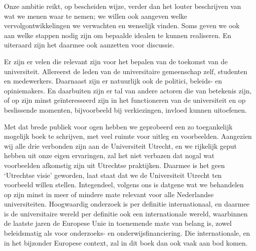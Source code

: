 \documentclass[smallauthor, chapterhaspagenum, nochapterinheader, pagenuminheader,  bigchapnum,medium2, tocpages, garamond, titleinheader]{jote-book}
\begin{document}
	Onze ambitie reikt, op bescheiden wijze, verder dan het louter beschrijven van wat we menen waar te nemen; we willen ook aangeven welke vervolgontwikkelingen we verwachten en wenselijk vinden. Soms geven we ook aan welke stappen nodig zijn om bepaalde idealen te kunnen realiseren. En uiteraard zijn het daarmee ook aanzetten voor discussie.



	Er zijn er velen die relevant zijn voor het bepalen van de toekomst van de universiteit. Allereerst de leden van de universitaire gemeenschap zelf, studenten en medewerkers. Daarnaast zijn er natuurlijk ook de politici, beleids- en opiniemakers. En daarbuiten zijn er tal van andere actoren die van betekenis zijn, of op zijn minst geïnteresseerd zijn in het functioneren van de universiteit en op beslissende momenten, bijvoorbeeld bij verkiezingen, invloed kunnen uitoefenen.



	Met dat brede publiek voor ogen hebben we geprobeerd een zo toegankelijk mogelijk boek te schrijven, met veel ruimte voor uitleg en voorbeelden. Aangezien wij alle drie verbonden zijn aan de Universiteit Utrecht, en we rijkelijk geput hebben uit onze eigen ervaringen, zal het niet verbazen dat nogal wat voorbeelden afkomstig zijn uit Utrechtse praktijken. Daarmee is het geen ‘Utrechtse visie' geworden, laat staat dat we de Universiteit Utrecht ten voorbeeld willen stellen. Integendeel, volgens ons is datgene wat we behandelen op zijn minst in meer of mindere mate relevant voor alle Nederlandse universiteiten. Hoogwaardig onderzoek is per definitie internationaal, en daarmee is de universitaire wereld per definitie ook een internationale wereld, waarbinnen de laatste jaren de Europese Unie in toenemende mate van belang is, zowel beleidsmatig als voor onderzoeks- en onderwijsfinanciering. Die internationale, en in het bijzonder Europese context, zal in dit boek dan ook vaak aan bod komen.
\end{document}

